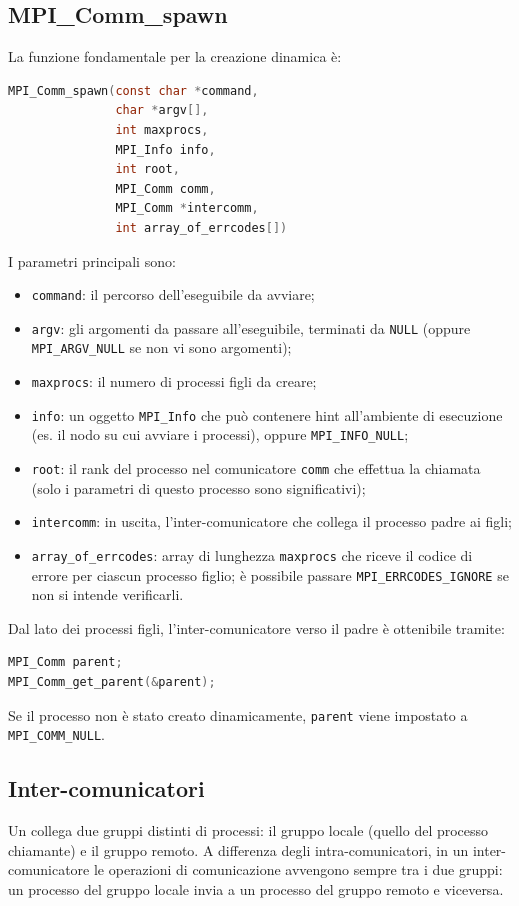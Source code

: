\subsection{MPI\_Comm\_spawn}
La funzione fondamentale per la creazione dinamica è:
\begin{lstlisting}[language=C, numbers=none]
MPI_Comm_spawn(const char *command,
               char *argv[],
               int maxprocs,
               MPI_Info info,
               int root,
               MPI_Comm comm,
               MPI_Comm *intercomm,
               int array_of_errcodes[])
\end{lstlisting}
I parametri principali sono:
\begin{itemize}
    \item \texttt{command}: il percorso dell'eseguibile da avviare;
    \item \texttt{argv}: gli argomenti da passare all'eseguibile, terminati da \texttt{NULL} (oppure \texttt{MPI\_ARGV\_NULL} se non vi sono argomenti);
    \item \texttt{maxprocs}: il numero di processi figli da creare;
    \item \texttt{info}: un oggetto \texttt{MPI\_Info} che può contenere hint all'ambiente di esecuzione (es. il nodo su cui avviare i processi), oppure \texttt{MPI\_INFO\_NULL};
    \item \texttt{root}: il rank del processo nel comunicatore \texttt{comm} che effettua la chiamata (solo i parametri di questo processo sono significativi);
    \item \texttt{intercomm}: in uscita, l'inter-comunicatore che collega il processo padre ai figli;
    \item \texttt{array\_of\_errcodes}: array di lunghezza \texttt{maxprocs} che riceve il codice di errore per ciascun processo figlio; è possibile passare \texttt{MPI\_ERRCODES\_IGNORE} se non si intende verificarli.
\end{itemize}

Dal lato dei processi figli, l'inter-comunicatore verso il padre è ottenibile tramite:
\begin{lstlisting}[language=C, numbers=none]
MPI_Comm parent;
MPI_Comm_get_parent(&parent);
\end{lstlisting}
Se il processo non è stato creato dinamicamente, \texttt{parent} viene impostato a \texttt{MPI\_COMM\_NULL}.

\subsection{Inter-comunicatori}
Un  collega due gruppi distinti di processi: il gruppo locale (quello del processo chiamante) e il gruppo remoto. A differenza degli intra-comunicatori, in un inter-comunicatore le operazioni di comunicazione avvengono sempre tra i due gruppi: un processo del gruppo locale invia a un processo del gruppo remoto e viceversa.

